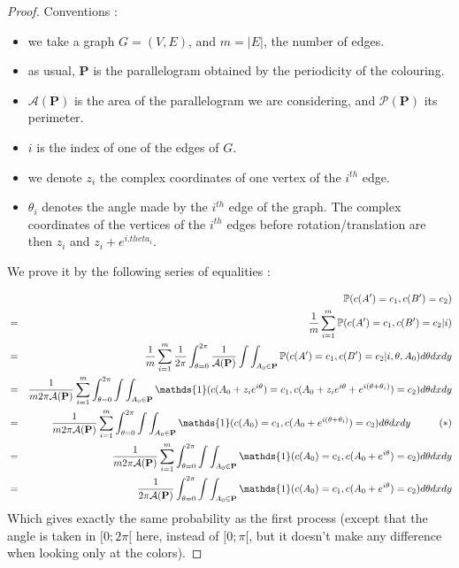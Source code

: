 \documentclass[a4paper,11pt]{article}
\theoremstyle{definition}
\theoremstyle{remark}
\begin{document}
\begin{proof}
Conventions : 
\begin{itemize}
\item we take a graph $G=(V,E)$, and $m = |E|$, the number of edges.

\item as usual, $\mathbf{P}$ is the parallelogram obtained by the periodicity 
of the colouring.

\item $\mathcal{A}(\mathbf{P})$ is the area of the parallelogram we are 
considering, and $\mathcal{P}(\mathbf{P})$ its perimeter.

\item $i$ is the index of one of the edges of $G$.

\item we denote $z_i$ the complex coordinates of one vertex of the $i^{th}$ 
edge.

\item $\theta_i$ denotes the angle made by the $i^{th}$ edge of the graph. The 
complex coordinates of the vertices of the $i^{th}$ edges before 
rotation/translation are then $z_i $ and $z_i + e^{i.theta_i}$.

\end{itemize}

We prove it by the following series of equalities :

\begin{eqnarray*}
& & \mathbb{P}(c(A') = c_1, c(B') = c_2) \\
  &=& \frac{1}{m}\sum_{i=1}^{m} \mathbb{P}(c(A') = c_1, c(B') = c_2 | i)  \\
  &=& \frac{1}{m}\sum_{i=1}^{m}  \frac{1}{2\pi}\int_{\theta =0} ^{2\pi} \frac{1}{\mathcal{A}(\mathbf{P})}\int\int_{A_0 \in \mathbf{P}} \mathbb{P}(c(A') = c_1, c(B') = c_2 | i, \theta, A_0) d\theta dx dy \\  
  &=& \frac{1}{m 2\pi \mathcal{A}(\mathbf {P})}\sum_{i=1}^{m}\int_{\theta =0} ^{2\pi} \int\int_{A_0 \in \mathbf{P}} \mathds{1}(c(A_0 + z_i e^{i\theta}) = c_1, c(A_0 +z_i e^{i\theta} + e^{i (\theta + \theta_i)}) = c_2) d\theta dx dy \\  
    &=& \frac{1}{m 2\pi \mathcal{A}(\mathbf{P})}\sum_{i=1}^{m} \int_{\theta =0} ^{2\pi} \int\int_{A_0 \in \mathbf{P}} \mathds{1}(c(A_0) = c_1, c(A_0 + e^{i (\theta + \theta_i)}) = c_2 ) d\theta dx dy \hspace{1 cm} (*)\\ 
    &=& \frac{1}{m 2\pi \mathcal{A}(\mathbf{P})}\sum_{i=1}^{m} \int_{\theta =0} ^{2\pi} \int\int_{A_0 \in \mathbf{P}} \mathds{1}(c(A_0) = c_1, c(A_0 + e^{i \theta}) = c_2 ) d\theta dx dy \\ 
    &=& \frac{1}{2\pi \mathcal{A}(\mathbf{P})}\int_{\theta =0} ^{2\pi} \int\int_{A_0 \in \mathbf{P}} \mathds{1}(c(A_0) = c_1, c(A_0 + e^{i \theta}) = c_2 ) d\theta dx dy \\ 
\end{eqnarray*}
Which gives exactly the same probability as the first process (except that the 
angle is taken in $[0;2\pi[$ here, instead of $[0;\pi[$, but it doesn't make 
any difference when looking only at the colors).


\end{proof}
\end{document}
